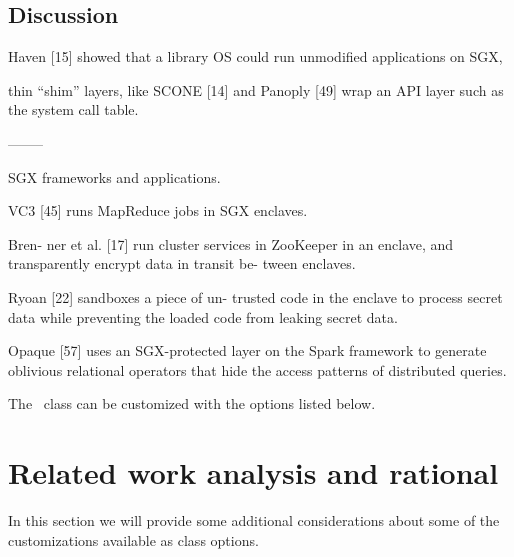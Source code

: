 \subsection{Discussion}
\label{ssec:sgx_frameworks_discussion}

Haven [15] showed
that a library OS could run unmodified applications on
SGX,

thin “shim” layers, like SCONE [14] and Panoply [49] wrap 
an API layer such as the system call table.


--------


SGX frameworks and applications.

VC3 [45]
runs MapReduce jobs in SGX enclaves.

Bren-
ner et al. [17] run cluster services in ZooKeeper in an
enclave, and transparently encrypt data in transit be-
tween enclaves.

Ryoan [22] sandboxes a piece of un-
trusted code in the enclave to process secret data while
preventing the loaded code from leaking secret data.

Opaque [57] uses an SGX-protected layer on the Spark
framework to generate oblivious relational operators that
hide the access patterns of distributed queries.

The \novathesis\ class can be customized with the options listed below.



\section{Related work analysis and rational} %
\label{sec:relatedwork_analysis}

In this section we will provide some additional considerations about some of the customizations available as class options.



